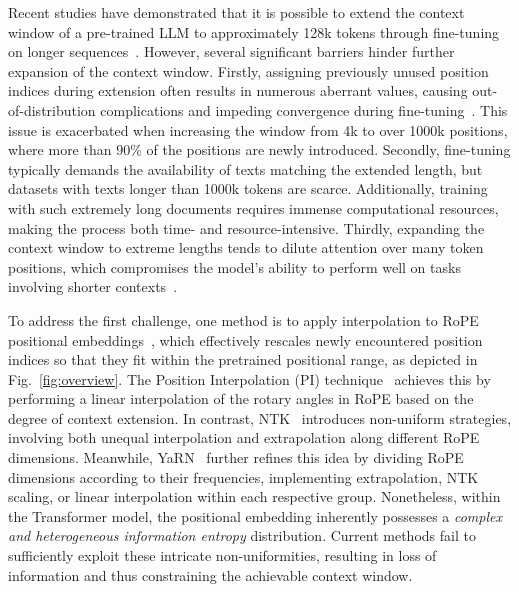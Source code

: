 Recent studies have demonstrated that it is possible to extend the context window of a pre-trained LLM to approximately 128k tokens through fine-tuning on longer sequences~\cite{longlora,pi,yarn,zhang2024soaring,liu2023scaling}. However, several significant barriers hinder further expansion of the context window. Firstly, assigning previously unused position indices during extension often results in numerous aberrant values, causing out-of-distribution complications and impeding convergence during fine-tuning~\cite{pi}. This issue is exacerbated when increasing the window from 4k to over 1000k positions, where more than 90\% of the positions are newly introduced. Secondly, fine-tuning typically demands the availability of texts matching the extended length, but datasets with texts longer than 1000k tokens are scarce. Additionally, training with such extremely long documents requires immense computational resources, making the process both time- and resource-intensive. Thirdly, expanding the context window to extreme lengths tends to dilute attention over many token positions, which compromises the model’s ability to perform well on tasks involving shorter contexts~\cite{pi}.

To address the first challenge, one method is to apply interpolation to RoPE positional embeddings~\cite{rope,pi}, which effectively rescales newly encountered position indices so that they fit within the pretrained positional range, as depicted in Fig.~\ref{fig:overview}. The Position Interpolation (PI) technique~\cite{pi} achieves this by performing a linear interpolation of the rotary angles in RoPE based on the degree of context extension. In contrast, NTK~\cite{ntk,dynamicntk} introduces non-uniform strategies, involving both unequal interpolation and extrapolation along different RoPE dimensions. Meanwhile, YaRN~\cite{yarn} further refines this idea by dividing RoPE dimensions according to their frequencies, implementing extrapolation, NTK scaling, or linear interpolation within each respective group. Nonetheless, within the Transformer model, the positional embedding inherently possesses a \emph{complex and heterogeneous information entropy} distribution. Current methods fail to sufficiently exploit these intricate non-uniformities, resulting in loss of information and thus constraining the achievable context window.

